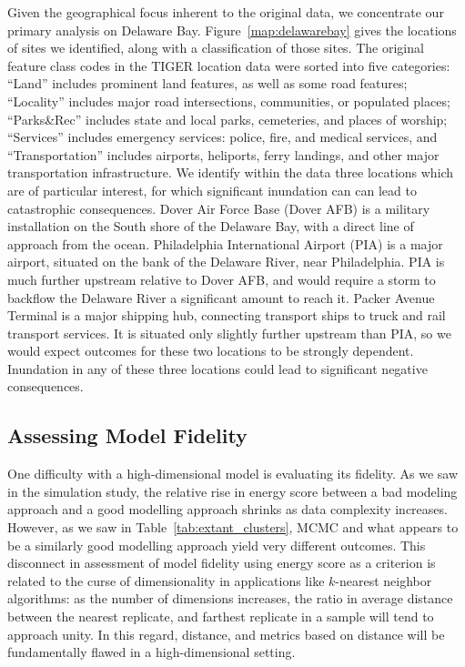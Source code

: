 Given the geographical focus inherent to the original data, we concentrate our primary
    analysis on Delaware Bay.  Figure~\ref{map:delawarebay} gives the locations of sites
    we identified, along with a classification of those sites.  The original feature class
    codes in the TIGER location data were sorted into five categories:  ``Land'' includes
    prominent land features, as well as some road features; ``Locality'' includes major road
    intersections, communities, or populated places; ``Parks\&Rec'' includes state and local
    parks, cemeteries, and places of worship; ``Services'' includes emergency services: police,
    fire, and medical services, and ``Transportation'' includes airports, heliports, ferry
    landings, and other major transportation infrastructure.  We identify within the data
    three locations which are of particular interest, for which significant inundation can
    can lead to catastrophic consequences.  Dover Air Force Base (Dover AFB) is a military
    installation on the South shore of the Delaware Bay, with a direct line of approach from 
    the ocean.  Philadelphia International Airport  (PIA) is a major airport, situated on the 
    bank of the Delaware River, near Philadelphia.   PIA is much further upstream relative to
    Dover AFB, and would require a storm to backflow the Delaware River a significant amount
    to reach it.  Packer Avenue Terminal is a major shipping hub, connecting transport ships to
    truck and rail transport services.  It is situated only slightly further upstream than PIA,
    so we would expect outcomes for these two locations to be strongly dependent.
    Inundation in any of these three locations could lead to significant negative consequences.

\subsection{Assessing Model Fidelity\label{subsec:sloshfidelity}}

One difficulty with a high-dimensional model is evaluating its fidelity.  As we saw in 
    the simulation study, the relative rise in energy score between a bad modeling approach 
    and a good modelling approach shrinks as data complexity increases.  However, as we 
    saw in Table~\ref{tab:extant_clusters}, MCMC and what appears to be a similarly good 
    modelling approach yield very different outcomes.  This disconnect in assessment of 
    model fidelity using energy score as a criterion is related to the curse of dimensionality 
    in applications like $k$-nearest neighbor algorithms: as the number of dimensions 
    increases, the ratio in average distance between the nearest replicate, and farthest 
    replicate in a sample will tend to approach unity.  In this regard, distance, and metrics 
    based on distance will be fundamentally flawed in a high-dimensional setting.

